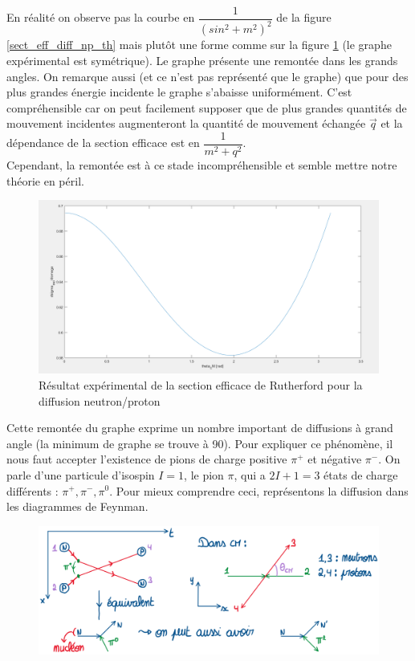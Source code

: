 En réalité on observe pas la courbe en $\dfrac{1}{(sin^2 + m^2)^2}$ de la figure \ref{sect_eff_diff_np_th} mais plutôt une forme comme sur la figure \ref{sect_eff_diff_np_exp} (le graphe expérimental est symétrique). Le graphe présente une remontée dans les grands angles. On remarque aussi (et ce n'est pas représenté que le graphe) que pour des plus grandes énergie incidente le graphe s'abaisse uniformément. C'est compréhensible car on peut facilement supposer que de plus grandes quantités de mouvement incidentes augmenteront la quantité de mouvement échangée $\Vec{q}$ et la dépendance de la section efficace est en $\dfrac{1}{m^2 + q^2}$.\\
Cependant, la remontée est à ce stade incompréhensible et semble mettre notre théorie en péril.\\
\begin{figure}[H]
    \centering
    \includegraphics[scale = 0.3]{Images4/Diffusion3.PNG}
    \caption{Résultat expérimental de la section efficace de Rutherford pour la diffusion neutron/proton}
    \label{sect_eff_diff_np_exp}
\end{figure}
Cette remontée du graphe exprime un nombre important de diffusions à grand angle (la minimum de graphe se trouve à 90\degree). Pour expliquer ce phénomène, il nous faut accepter l'existence de pions de charge positive $\pi^+$ et négative $\pi^-$. On parle d'une particule d'isospin $I=1$, le pion $\pi$, qui a $2I +1 =3$ états de charge différents : $\pi^+,\pi^-,\pi^0$. Pour mieux comprendre ceci, représentons la diffusion dans les diagrammes de Feynman.
\begin{figure}[H]
    \centering
    \includegraphics[scale = 0.5]{Images4/Feynmann_pi.png}
\end{figure}
